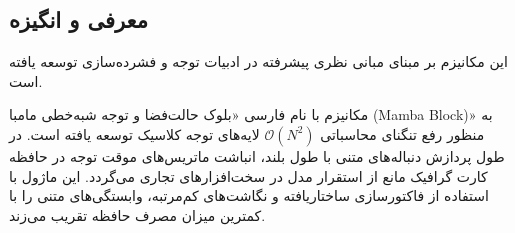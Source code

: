 \subsection{معرفی و انگیزه}
این مکانیزم بر مبنای مبانی نظری پیشرفته در ادبیات توجه و فشرده‌سازی \cite{gu2023mamba} توسعه یافته است.

مکانیزم  با نام فارسی «بلوک حالت‌فضا و توجه شبه‌خطی مامبا (Mamba Block)» به منظور رفع تنگنای محاسباتی $\mathcal{O}(N^2)$ لایه‌های توجه کلاسیک توسعه یافته است. در طول پردازش دنباله‌های متنی با طول بلند، انباشت ماتریس‌های موقت توجه در حافظه کارت گرافیک مانع از استقرار مدل در سخت‌افزارهای تجاری می‌گردد. این ماژول با استفاده از فاکتورسازی ساختاریافته و نگاشت‌های کم‌مرتبه، وابستگی‌های متنی را با کمترین میزان مصرف حافظه تقریب می‌زند.

